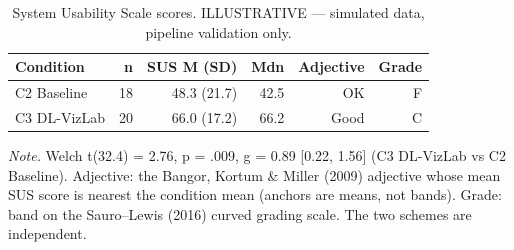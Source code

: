 \begin{table}[htbp]
\centering
\small
\caption{System Usability Scale scores. ILLUSTRATIVE — simulated data, pipeline validation only.}
\label{tab:T11}
\begin{tabular}{lrrrrr}
\toprule
Condition & n & SUS M (SD) & Mdn & Adjective & Grade \\
\midrule
C2 Baseline & 18 & 48.3 (21.7) & 42.5 & OK & F \\
C3 DL-VizLab & 20 & 66.0 (17.2) & 66.2 & Good & C \\
\bottomrule
\end{tabular}
\par\smallskip\footnotesize\textit{Note.} Welch t(32.4) = 2.76, p = .009, g = 0.89 [0.22, 1.56] (C3 DL-VizLab vs C2 Baseline). Adjective: the Bangor, Kortum \& Miller (2009) adjective whose mean SUS score is nearest the condition mean (anchors are means, not bands). Grade: band on the Sauro–Lewis (2016) curved grading scale. The two schemes are independent.
\end{table}
